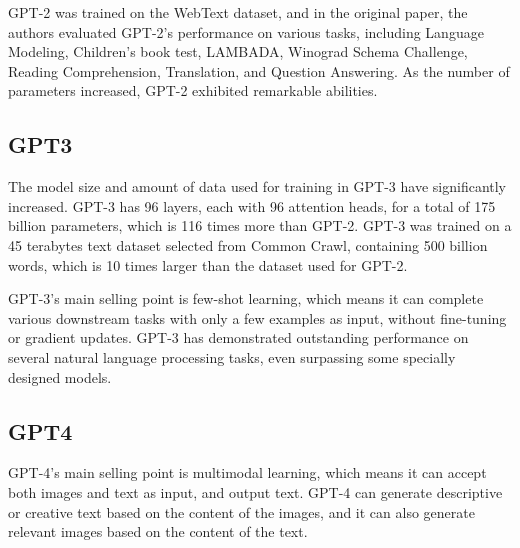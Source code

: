 \documentclass[conference]{IEEEtran}
\begin{document}
\par GPT-2 was trained on the WebText dataset, and in the original paper, 
the authors evaluated GPT-2's performance on various tasks, including Language Modeling, 
Children's book test, LAMBADA, Winograd Schema Challenge, Reading Comprehension, 
Translation, and Question Answering. As the number of parameters increased, 
GPT-2 exhibited remarkable abilities.

\subsection{GPT3}

\par The model size and amount of data used for training in GPT-3 have significantly 
increased. GPT-3 has 96 layers, each with 96 attention heads, for a total of 175 billion 
parameters, which is 116 times more than GPT-2. GPT-3 was trained on a 45 terabytes 
text dataset selected from Common Crawl, containing 500 billion words, which is 
10 times larger than the dataset used for GPT-2.

\par GPT-3's main selling point is few-shot learning, which means it can complete various 
downstream tasks with only a few examples as input, without fine-tuning or gradient 
updates. GPT-3 has demonstrated outstanding performance on several natural language 
processing tasks, even surpassing some specially designed models.

\subsection{GPT4}

\par GPT-4's main selling point is multimodal learning, which means it 
can accept both images and text as input, and output text. 
GPT-4 can generate descriptive or creative text based on the content 
of the images, and it can also generate relevant images based on the content 
of the text. 


\end{document}
